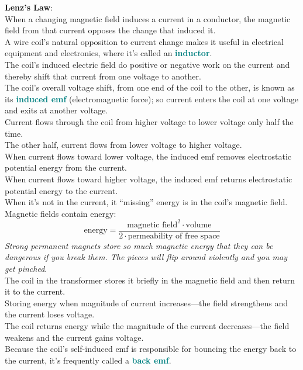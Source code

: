 \documentclass[12pt]{article}
\theoremstyle{definition}
\newcommand{\defnterm}[1]{\textbf{\textcolor{teal}{#1}}\index{#1}}
\begin{document}
\textbf{Lenz's Law}: \\
When a changing magnetic field induces a current in a conductor, the magnetic field from that current opposes the change that induced it. \\

A wire coil's natural opposition to current change makes it useful in electrical equipment and electronics, where it's called an \defnterm{inductor}. \\

The coil's induced electric field do positive or negative work on the current and thereby shift that current from one voltage to another. \\
The coil's overall voltage shift, from one end of the coil to the other, is known as its \defnterm{induced emf} (electromagnetic force);
so current enters the coil at one voltage and exits at another voltage. \\

Current flows through the coil from higher voltage to lower voltage only half the time. \\
The other half, current flows from lower voltage to higher voltage. \\

When current flows toward lower voltage, the induced emf removes electrostatic potential energy from the current. \\
When current flows toward higher voltage, the induced emf returns electrostatic potential energy to the current. \\
When it's not in the current, it ``missing'' energy is in the coil's magnetic field. \\
Magnetic fields contain energy:
$$\text{energy} = \frac{\text{magnetic field}^{2} \cdot \text{volume}}{2 \cdot \text{permeability of free space}}$$
\emph{Strong permanent magnets store so much magnetic energy that they can be dangerous if you break them. The pieces will flip around violently and you may get pinched}. \\

The coil in the transformer stores it briefly in the magnetic field and then return it to the current. \\
Storing energy when magnitude of current increases---the field strengthens and the current loses voltage. \\
The coil returns energy while the magnitude of the current decreases---the field weakens and the current gains voltage. \\
Because the coil's self-induced emf is responsible for bouncing the energy back to the current, it's frequently called a \defnterm{back emf}.
\end{document}

